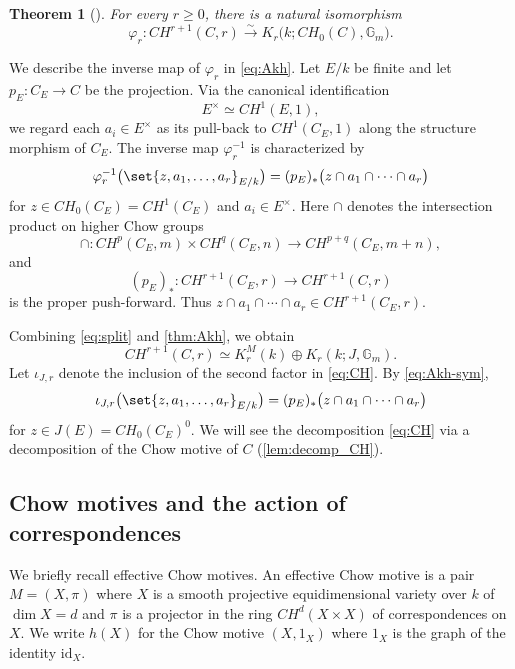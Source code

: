\documentclass[a4paper,12pt]{amsart}
\numberwithin{equation}{section}
\newtheorem{thm}{Theorem}[section]
\theoremstyle{definition}
\newcommand{\Gm}{\mathbb{G}_{m}}
\begin{document}
\begin{thm}[{\cite[Theorem~6.1]{Akh04}}]\label{thm:Akh}
For every $r\geq0$, there is a natural isomorphism
\begin{equation}\label{eq:Akh}
 \varphi_r\colon
 CH^{r+1}(C,r)
 \overset{\sim}{\to}
 K_r\bigl(k;CH_0(C),\Gm\bigr).
\end{equation}
\end{thm}

We describe the inverse map of $\varphi_r$ in \eqref{eq:Akh}.
Let $E/k$ be finite and let $p_E\colon C_E\to C$ be the projection.
Via the canonical identification
\[
 E^\times\simeq CH^1(E,1),
\]
we regard each $a_i\in E^\times$ as its pull-back to
$CH^1(C_E,1)$ along the structure morphism of $C_E$.  The inverse map
$\varphi_r^{-1}$ is characterized by
\begin{equation}\label{eq:Akh-sym}
 \varphi_r^{-1}\bigl(\set{z,a_1,\ldots,a_r}_{E/k}\bigr)
 = (p_E)_*\bigl(z\cap a_1\cap\cdots\cap a_r\bigr)
\end{equation}
for $z\in CH_0(C_E)=CH^1(C_E)$ and $a_i\in E^\times$.  Here $\cap$
denotes the intersection product on higher Chow groups
\[
 \cap\colon CH^p(C_E,m)\times CH^q(C_E,n)
 \to CH^{p+q}(C_E,m+n),
\]
and
\[
 (p_E)_*\colon CH^{r+1}(C_E,r)\to CH^{r+1}(C,r)
\]
is the proper push-forward.  Thus
$z\cap a_1\cap\cdots\cap a_r\in CH^{r+1}(C_E,r)$.

Combining \eqref{eq:split} and \autoref{thm:Akh}, we obtain
\begin{equation}\label{eq:CH}
 CH^{r+1}(C,r)
 \simeq
 K_r^M(k)\oplus
 K_r(k;J,\Gm).
\end{equation}
Let $\iota_{J,r}$ denote the inclusion of the second factor in
\eqref{eq:CH}.  By \eqref{eq:Akh-sym},
\begin{equation}\label{eq:iota}
 \iota_{J,r}\bigl(\set{z,a_1,\ldots,a_r}_{E/k}\bigr)
 = (p_E)_*\bigl(z\cap a_1\cap\cdots\cap a_r\bigr)
\end{equation}
for $z\in J(E)=CH_0(C_E)^0$.
We will see the decomposition \eqref{eq:CH} via a decomposition of the Chow motive of $C$ (\autoref{lem:decomp_CH}).






\subsection{Chow motives and the action of correspondences}
We briefly recall effective Chow motives.
An effective Chow motive is a pair $M=(X,\pi)$ where $X$ is a smooth projective equidimensional variety over $k$ of $\dim X=d$ and $\pi$ is a projector in the ring $CH^{d}(X\times X)$ of correspondences on $X$.
We write $h(X)$ for the Chow motive $(X,1_X)$ where $1_X$ is the graph of the identity $\mathrm{id}_X$. 
\end{document}
